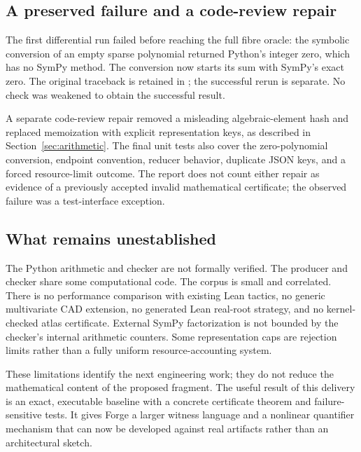 \subsection{A preserved failure and a code-review repair}
The first differential run failed before reaching the full fibre oracle: the symbolic conversion of an empty sparse polynomial returned Python's integer zero, which has no SymPy  method. The conversion now starts its sum with SymPy's exact zero. The original traceback is retained in ; the successful rerun is separate. No check was weakened to obtain the successful result.

A separate code-review repair removed a misleading algebraic-element hash and replaced memoization with explicit representation keys, as described in Section~\ref{sec:arithmetic}. The final unit tests also cover the zero-polynomial conversion, endpoint convention, reducer behavior, duplicate JSON keys, and a forced resource-limit outcome. The report does not count either repair as evidence of a previously accepted invalid mathematical certificate; the observed failure was a test-interface exception.

\subsection{What remains unestablished}
The Python arithmetic and checker are not formally verified. The producer and checker share some computational code. The corpus is small and correlated. There is no performance comparison with existing Lean tactics, no generic multivariate CAD extension, no generated Lean real-root strategy, and no kernel-checked atlas certificate. External SymPy factorization is not bounded by the checker's internal arithmetic counters. Some representation caps are rejection limits rather than a fully uniform resource-accounting system.

These limitations identify the next engineering work; they do not reduce the mathematical content of the proposed fragment. The useful result of this delivery is an exact, executable baseline with a concrete certificate theorem and failure-sensitive tests. It gives Forge a larger witness language and a nonlinear quantifier mechanism that can now be developed against real artifacts rather than an architectural sketch.
